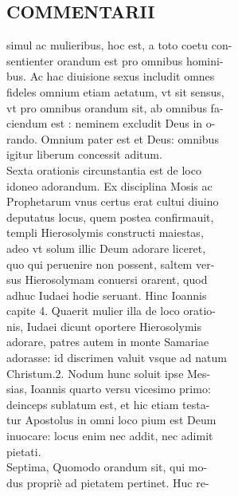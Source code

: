 \documentclass{article}
\begin{document}
\begin{pages}
\section*{COMMENTARII \\
                }simul ac mulieribus, hoc est, a toto coetu con- \\
                sentienter orandum est pro omnibus homini- \\
                bus. Ac hac diuisione sexus includit omnes \\
                fideles omnium etiam aetatum, vt sit sensus, \\
                vt pro omnibus orandum sit, ab omnibus fa- \\
                ciendum est : neminem excludit Deus in o- \\
                rando. Omnium pater est et Deus: omnibus \\
                igitur liberum concessit aditum. \\
                Sexta orationis circunstantia est de loco \\
                idoneo adorandum. Ex disciplina Mosis ac \\
                Prophetarum vnus certus erat cultui diuino \\
                deputatus locus, quem postea confirmauit, \\
                templi Hierosolymis constructi maiestas, \\
                adeo vt solum illic Deum adorare liceret, \\
                quo qui peruenire non possent, saltem ver- \\
                sus Hierosolymam conuersi orarent, quod \\
                adhuc Iudaei hodie seruant. Hinc Ioannis \\
                capite 4. Quaerit mulier illa de loco oratio- \\
                nis, Iudaei dicunt oportere Hierosolymis \\
                adorare, patres autem in monte Samariae \\
                adorasse: id discrimen valuit vsque ad natum \\
                Christum.2. Nodum hunc soluit ipse Mes- \\
                sias, Ioannis quarto versu vicesimo primo: \\
                deinceps sublatum est, et hic etiam testa- \\
                tur Apostolus in omni loco pium est Deum \\
                inuocare: locus enim nec addit, nec adimit \\
                pietati. \\
                Septima, Quomodo orandum sit, qui mo- \\
                dus propriè ad pietatem pertinet. Huc re- \\
                

\end{pages}
\end{document}
